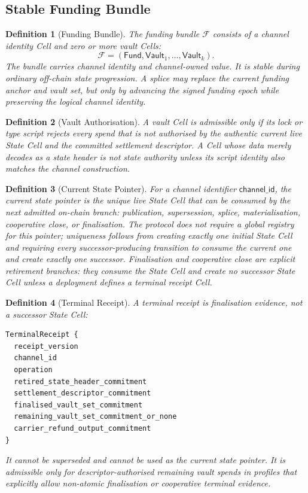 \documentclass[a4paper,11pt]{article}
\newtheorem{definition}{Definition}
\newcommand{\Fund}{\mathsf{Fund}}
\newcommand{\Vault}{\mathsf{Vault}}
\begin{document}
\subsection{Stable Funding Bundle}

\begin{definition}[Funding Bundle]
The funding bundle $\mathcal{F}$ consists of a channel identity Cell and zero or more vault Cells:
\[
\mathcal{F} = (\Fund, \Vault_1,\ldots,\Vault_k).
\]
The bundle carries channel identity and channel-owned value. It is stable during ordinary off-chain state progression. A splice may replace the current funding anchor and vault set, but only by advancing the signed funding epoch while preserving the logical channel identity.
\end{definition}

\begin{definition}[Vault Authorisation]
A vault Cell is admissible only if its lock or type script rejects every spend that is not authorised by the authentic current live State Cell and the committed settlement descriptor. A Cell whose data merely decodes as a state header is not state authority unless its script identity also matches the channel construction.
\end{definition}

\begin{definition}[Current State Pointer]
For a channel identifier $\mathsf{channel\_id}$, the current state pointer is the unique live State Cell that can be consumed by the next admitted on-chain branch: publication, supersession, splice, materialisation, cooperative close, or finalisation. The protocol does not require a global registry for this pointer; uniqueness follows from creating exactly one initial State Cell and requiring every successor-producing transition to consume the current one and create exactly one successor. Finalisation and cooperative close are explicit retirement branches: they consume the State Cell and create no successor State Cell unless a deployment defines a terminal receipt Cell.
\end{definition}

\begin{definition}[Terminal Receipt]
A terminal receipt is finalisation evidence, not a successor State Cell:
\begin{lstlisting}
TerminalReceipt {
  receipt_version
  channel_id
  operation
  retired_state_header_commitment
  settlement_descriptor_commitment
  finalised_vault_set_commitment
  remaining_vault_set_commitment_or_none
  carrier_refund_output_commitment
}
\end{lstlisting}
It cannot be superseded and cannot be used as the current state pointer. It is
admissible only for descriptor-authorised remaining vault spends in profiles
that explicitly allow non-atomic finalisation or cooperative terminal evidence.
\end{definition}
\end{document}
